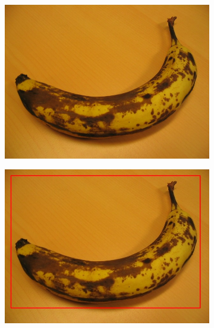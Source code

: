 \documentclass[a4paper,11]{article}
\begin{document}
\begin{center}
\begin{figure}[H]
\begin{subfigure}{0.33\textwidth}
    \end{subfigure}\\
      \vspace{1em}
      
    \begin{subfigure}{0.33\textwidth}
      \centering
      \includegraphics[width=0.9\linewidth]{images/banana1}
    \end{subfigure}
    \begin{subfigure}{.33\textwidth}
      \centering
      \includegraphics[width=0.9\linewidth]{results/input/banana1}
    \end{subfigure}
    \begin{subfigure}{0.33\textwidth}
      \centering

\end{subfigure}
\end{figure}
\end{center}
\end{document}
